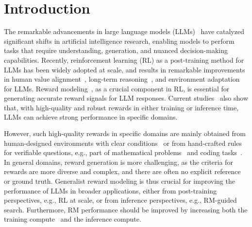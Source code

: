 \documentclass{article} %
\begin{document}
\section{Introduction}

The remarkable advancements in large language models (LLMs)~\citep{deepseekai2024deepseekv3technicalreport,gpt45-system-card} have catalyzed significant shifts in artificial intelligence research, enabling models to perform tasks that require understanding, generation, and nuanced decision-making capabilities. Recently, reinforcement learning (RL) as a post-training method for LLMs has been widely adopted at scale, and results in remarkable improvements in human value alignment~\citep{instructgpt,bai2022traininghelpfulharmlessassistant}, long-term reasoning~\citep{deepseekai2025deepseekr1incentivizingreasoningcapability,o3-system-card}, and environment adaptation~\citep{deep-research-system-card} for LLMs. Reward modeling~\citep{pmlr-v202-gao23h}, as a crucial component in RL, is essential for generating accurate reward signals for LLM responses. Current studies~\citep{lightman2024lets,deepseekai2025deepseekr1incentivizingreasoningcapability} also show that, with high-quality and robust rewards in either training or inference time, LLMs can achieve strong performance in specific domains. 

However, such high-quality rewards in specific domains are mainly obtained from human-designed environments with clear conditions~\citep{yao2022webshop,xie2024osworld} or from hand-crafted rules for verifiable questions, e.g., part of mathematical problems~\citep{hendrycks2021measuring,aime_1983_2024} and coding tasks~\citep{jimenez2024swebench,zhuo2025bigcodebench}. In general domains, reward generation is more challenging, as the criteria for rewards are more diverse and complex, and there are often no explicit reference or ground truth. Generalist reward modeling is thus crucial for improving the performance of LLMs in broader applications, either from post-training perspectives, e.g., RL at scale, or from inference perspectives, e.g., RM-guided search. Furthermore, RM performance should be improved by increasing both the training compute~\citep{pmlr-v202-gao23h} and the inference compute. 
\end{document}
